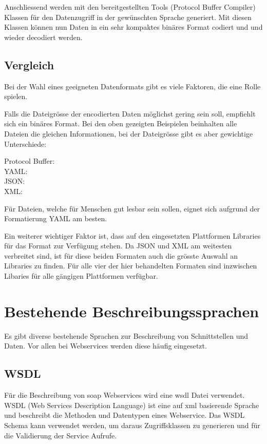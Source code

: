 Anschliessend werden mit den bereitgestellten Tools (Protocol Buffer Compiler) Klassen für den Datenzugriff in der gewünschten Sprache generiert. Mit diesen Klassen können nun Daten in ein sehr kompaktes binäres Format codiert und und wieder decodiert werden.

\subsection{Vergleich}

Bei der Wahl eines geeigneten Datenformats gibt es viele Faktoren, die eine Rolle spielen.

Falls die Dateigrösse der encodierten Daten möglichst gering sein soll, empfiehlt sich ein binäres Format. Bei den oben gezeigten Beispielen beinhalten alle Dateien die gleichen Informationen, bei der Dateigrösse gibt es aber gewichtige Unterschiede:

Protocol Buffer:   \\
YAML:              \\
JSON:              \\
XML:              

Für Dateien, welche für Menschen gut lesbar sein sollen, eignet sich aufgrund der Formatierung YAML am besten. 

Ein weiterer wichtiger Faktor ist, dass auf den eingesetzten Plattformen Libraries für das Format zur Verfügung stehen. Da JSON und XML am weitesten verbreitet sind, ist für diese beiden Formaten auch die grösste Auswahl an Libraries zu finden. Für alle vier der hier behandelten Formaten sind inzwischen Libaries für alle gängigen Plattformen verfügbar.


\section{Bestehende Beschreibungssprachen}

Es gibt diverse bestehende Sprachen zur Beschreibung von Schnittstellen und Daten. Vor allen bei Webservices werden diese häufig eingesetzt.

\subsection{WSDL}
Für die Beschreibung von \gls{soap} Webservices wird eine \gls{wsdl} Datei verwendet. WSDL (Web Services Description Language) ist eine auf \gls{xml} basierende Sprache und beschreibt die Methoden und Datentypen eines Webservice. Das WSDL Schema kann verwendet werden, um daraus Zugriffsklassen zu generieren und für die Validierung der Service Aufrufe.

